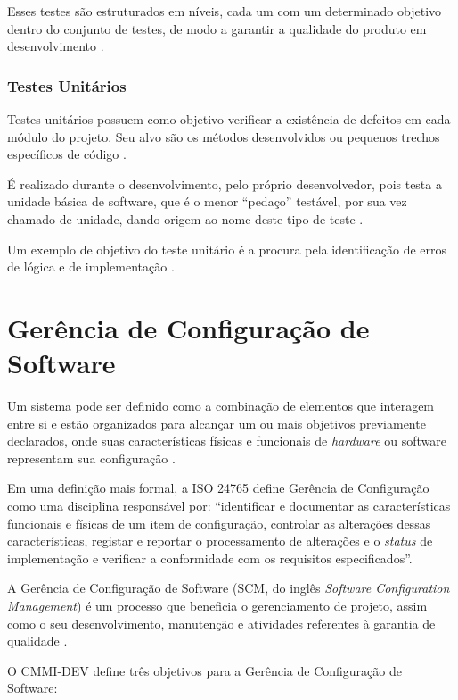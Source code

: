 Esses testes são estruturados em níveis, cada um com um determinado objetivo dentro do conjunto de testes, de modo a garantir a qualidade do produto em desenvolvimento \cite{sw_test_tech}.

    \subsubsection{Testes Unitários}
    Testes unitários possuem como objetivo verificar a existência de defeitos em cada módulo do projeto. Seu alvo são os métodos desenvolvidos ou pequenos trechos específicos de código \cite{artigo_intro_teste}.

    É realizado durante o desenvolvimento, pelo próprio desenvolvedor, pois testa a unidade básica de software, que é o menor ``pedaço''  testável, por sua vez chamado de unidade, dando origem ao nome deste tipo de teste \cite{sw_test_tech}.

    Um exemplo de objetivo do teste unitário é a procura pela identificação de erros de lógica e de implementação \cite{maldonado}.

\section{Gerência de Configuração de Software}
Um sistema pode ser definido como a combinação de elementos que interagem entre si e estão organizados para alcançar um ou mais objetivos previamente declarados, onde suas características físicas e funcionais de \textit{hardware} ou software representam sua configuração \cite{SWEBOK2014}.

Em uma definição mais formal, a ISO 24765 \cite{iso_24765} define Gerência de Configuração como uma disciplina responsável por: ``identificar e documentar as características funcionais e físicas de um item de configuração, controlar as alterações dessas características, registar e reportar o processamento de alterações e o \textit{status} de implementação e verificar a conformidade com os requisitos especificados''.

A Gerência de Configuração de Software (SCM, do inglês \textit{Software Configuration Management}) é um processo que beneficia o gerenciamento de projeto, assim como o seu desenvolvimento, manutenção e atividades referentes à garantia de qualidade \cite{SWEBOK2014}.

O CMMI-DEV \cite{cmmi_dev} define três objetivos para a Gerência de Configuração de Software:

